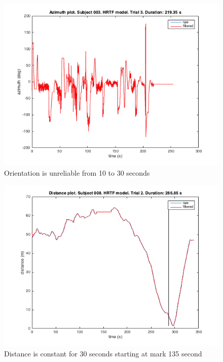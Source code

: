 \documentclass[journal]{IEEEtran}
\begin{document}
\begin{appendices}
\begin{figure}[h!]
  \centering
    \includegraphics[scale=0.5]{graphics/subject003htrftrial3.png}
  \caption{Orientation is unreliable from 10 to 30 seconds}
  \label{fig:plt2}
\end{figure}

\setlength{\abovecaptionskip}{15pt plus 3pt minus 2pt} %


\begin{figure}[h!]
  \centering
    \includegraphics[scale=0.5]{graphics/subject008htrftrial2.png}
  \caption{Distance is constant for 30 seconds starting at mark 135 second}
  \label{fig:plt3}
\end{figure}


\end{appendices}
\end{document}
